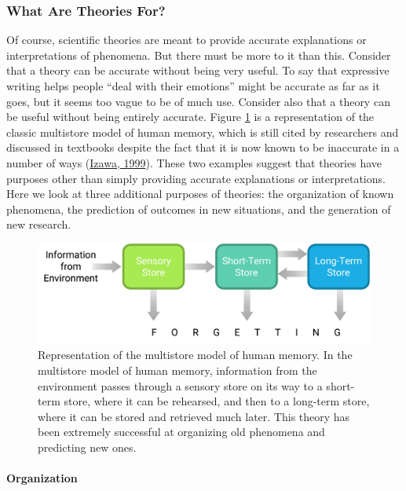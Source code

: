 \documentclass[
]{krantz}
\begin{document}
\hypertarget{what-are-theories-for}{%
\subsubsection*{What Are Theories For?}\label{what-are-theories-for}}


Of course, scientific theories are meant to provide accurate explanations or interpretations of phenomena. But there must be more to it than this. Consider that a theory can be accurate without being very useful. To say that expressive writing helps people ``deal with their emotions'' might be accurate as far as it goes, but it seems too vague to be of much use. Consider also that a theory can be useful without being entirely accurate. Figure \ref{fig:memory} is a representation of the classic multistore model of human memory, which is still cited by researchers and discussed in textbooks despite the fact that it is now known to be inaccurate in a number of ways (\protect\hyperlink{ref-izawa1999human}{Izawa, 1999}). These two examples suggest that theories have purposes other than simply providing accurate explanations or interpretations. Here we look at three additional purposes of theories: the organization of known phenomena, the prediction of outcomes in new situations, and the generation of new research.

\begin{figure}

{\centering \includegraphics[width=0.75\linewidth]{images/theory/memory} 

}

\caption{Representation of the multistore model of human memory. In the multistore model of human memory, information from the environment passes through a sensory store on its way to a short-term store, where it can be rehearsed, and then to a long-term store, where it can be stored and retrieved much later. This theory has been extremely successful at organizing old phenomena and predicting new ones.}\label{fig:memory}
\end{figure}

\hypertarget{organization}{%
\paragraph*{Organization}\label{organization}}
\end{document}
